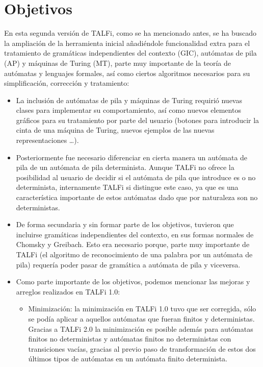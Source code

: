 \documentclass[12pt,a4paper,spanish]{book}
\newcommand{\clearemptydoublepage}{\newpage{\pagestyle{empty}
\cleardoublepage}}
\begin{document}
\clearemptydoublepage
\chapter{Objetivos}
En esta segunda versi\'on de TALFi, como se ha mencionado antes, se ha buscado la ampliaci\'on de la herramienta inicial a\~nadi\'endole funcionalidad extra para el tratamiento de gram\'aticas independientes del contexto (GIC), aut\'omatas de pila (AP) y m\'aquinas de Turing (MT), parte muy importante de la teor\'ia de aut\'omatas y lenguajes formales, as\'i como ciertos algoritmos necesarios para su simplificaci\'on, correcci\'on y tratamiento:
\begin{itemize}
\item La inclusi\'on de aut\'omatas de pila y m\'aquinas de Turing requiri\'o nuevas clases para implementar su comportamiento, as\'i como nuevos elementos gr\'aficos para su tratamiento por parte del usuario (botones para introducir la cinta de una m\'aquina de Turing, nuevos ejemplos de las nuevas representaciones \ldots).
\item Posteriormente fue necesario diferenciar en cierta manera un aut\'omata de pila de un aut\'omata de pila determinista. Aunque TALFi no ofrece la posibilidad al usuario de decidir si el aut\'omata de pila que introduce es o no determinista, internamente TALFi si distingue este caso, ya que es una caracter\'istica importante de estos aut\'omatas dado que por naturaleza son no deterministas.
\item De forma secundaria y sin formar parte de los objetivos, tuvieron que incluirse gram\'aticas independientes del contexto, en sus formas normales de Chomsky y Greibach.
Esto era necesario porque, parte muy importante de TALFi (el algoritmo de reconocimiento de una palabra por un aut\'omata de pila) requer\'ia poder pasar de gram\'atica a aut\'omata de pila y viceversa.
\newpage
\item Como parte importante de los objetivos, podemos mencionar las mejoras y arreglos realizados en TALFi 1.0:
\begin{itemize}
\item Minimizaci\'on: la minimizaci\'on en TALFi 1.0 tuvo que ser corregida, s\'olo se pod\'ia aplicar a aquellos aut\'omatas que fueran finitos y deterministas. Gracias a TALFi 2.0 la minimizaci\'on es posible adem\'as para aut\'omatas finitos no deterministas y aut\'omatas finitos no deterministas con transiciones vac\'ias, gracias al previo paso de transformaci\'on de estos dos \'ultimos tipos de aut\'omatas en un aut\'omata finito determinista.

\end{itemize}
\end{itemize}
\end{document}
